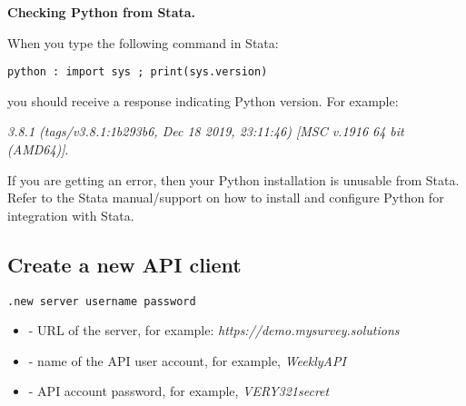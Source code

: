 \vskip16pt
\textbf{Checking Python from Stata.}\par
\vskip16pt
When you type the following command in Stata:\par
\vskip16pt
\begin{lstlisting}
python : import sys ; print(sys.version)
\end{lstlisting}
\vskip16pt
you should receive a response indicating Python version. For example: \par
\vskip16pt
\textit{3.8.1 (tags/v3.8.1:1b293b6, Dec 18 2019, 23:11:46) [MSC v.1916 64 bit (AMD64)]}.\par
\vskip16pt
If you are getting an error, then your Python installation is unusable from Stata. Refer to the Stata manual/support on how to install and configure Python for integration with Stata.


\vskip16pt
\subsection{Create a new API client}
\begin{lstlisting}
.new server username password
\end{lstlisting}

\paramsheader
\begin{itemize}
\item {} - URL of the server, for example: \textquotedbl\textit{https://demo.mysurvey.solutions}\textquotedbl
\item {} - name of the API user account, for example, \textquotedbl\textit{WeeklyAPI}\textquotedbl
\item {} - API account password, for example, \textquotedbl\textit{VERY321secret}\textquotedbl
\end{itemize}
